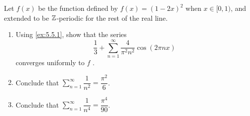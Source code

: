 \begin{ex}\label{ex:5.5.2}
  Let \(f(x)\) be the function defined by \(f(x) = (1 - 2x)^2\) when \(x \in [0, 1)\), and extended to be \(\mathbb{Z}\)-periodic for the rest of the real line.
  \begin{enumerate}
    \item Using \cref{ex:5.5.1}, show that the series
          \[
            \dfrac{1}{3} + \sum_{n = 1}^\infty \dfrac{4}{\pi^2 n^2} \cos(2 \pi n x)
          \]
          converges uniformly to \(f\) .
    \item Conclude that \(\sum_{n = 1}^\infty \dfrac{1}{n^2} = \dfrac{\pi^2}{6}\).
    \item Conclude that \(\sum_{n = 1}^\infty \dfrac{1}{n^4} = \dfrac{\pi^4}{90}\).
  \end{enumerate}
\end{ex}

